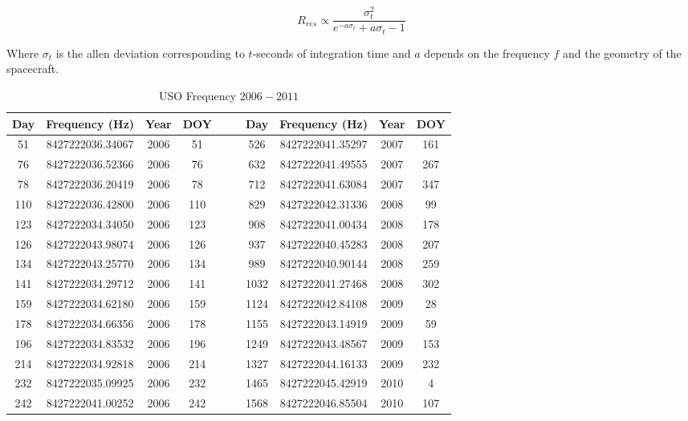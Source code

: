 \documentclass[oneside]{book}
\theoremstyle{mystyle}
\begin{document}
\begin{equation}
    R_{res} \propto \frac{\sigma_{t}^2}{e^{-a\sigma_{t}} +a\sigma_{t} - 1}
\end{equation}

Where $\sigma_{t}$ is the \gls{allen deviation} corresponding to $t$-seconds of integration time and $a$ depends on the frequency $f$ and the geometry of the spacecraft.


\begin{table}[H]
    \centering
    \caption{USO Frequency $2006-2011$}
    \label{tab:usr_uso_freq_vals}
    \begin{tabular}{|c c c c c | c c c c c|}
        \hline
        Day & Frequency (Hz) & Year & DOY & & &  Day & Frequency (Hz) & Year & DOY\\
         \hline
         51     & 8427222036.34067  & 2006  & 51  & & & 526  & 8427222041.35297 & 2007 & 161 \\
         76     & 8427222036.52366  & 2006  & 76  & & & 632  & 8427222041.49555 & 2007 & 267 \\
         78     & 8427222036.20419  & 2006  & 78  & & & 712  & 8427222041.63084 & 2007 & 347 \\
         110    & 8427222036.42800  & 2006  & 110 & & & 829  & 8427222042.31336 & 2008 & 99  \\
         123    & 8427222034.34050  & 2006  & 123 & & & 908  & 8427222041.00434 & 2008 & 178 \\
         126    & 8427222043.98074  & 2006  & 126 & & & 937  & 8427222040.45283 & 2008 & 207 \\
         134    & 8427222043.25770  & 2006  & 134 & & & 989  & 8427222040.90144 & 2008 & 259 \\
         141    & 8427222034.29712  & 2006  & 141 & & & 1032 & 8427222041.27468 & 2008 & 302 \\
         159    & 8427222034.62180  & 2006  & 159 & & & 1124 & 8427222042.84108 & 2009 &  28 \\
         178    & 8427222034.66356  & 2006  & 178 & & & 1155 & 8427222043.14919 & 2009 &  59 \\
         196    & 8427222034.83532  & 2006  & 196 & & & 1249 & 8427222043.48567 & 2009 & 153 \\
         214    & 8427222034.92818  & 2006  & 214 & & & 1327 & 8427222044.16133 & 2009 & 232 \\
         232    & 8427222035.09925  & 2006  & 232 & & & 1465 & 8427222045.42919 & 2010 &   4 \\
         242    & 8427222041.00252  & 2006  & 242 & & & 1568 & 8427222046.85504 & 2010 & 107 \\

\end{tabular}
\end{table}
\end{document}
